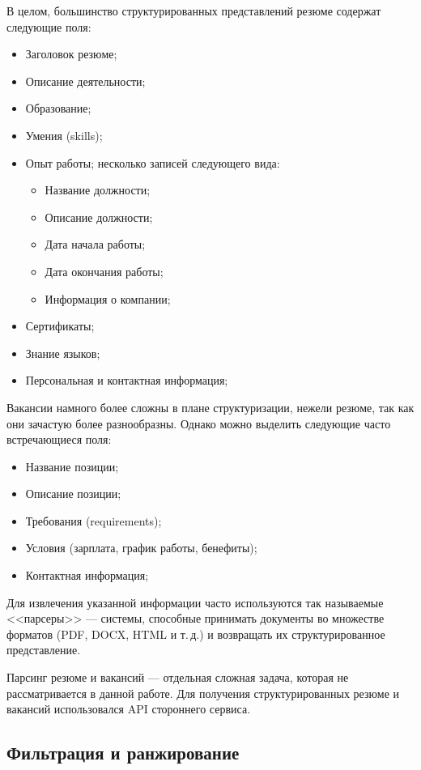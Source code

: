 \documentclass[14pt]{mmcs_article}
\begin{document}
В целом, большинство структурированных представлений резюме содержат следующие поля:

\begin{itemize}
  \item Заголовок резюме;
  \item Описание деятельности;
  \item Образование;
  \item Умения (skills);
  \item Опыт работы; несколько записей следующего вида:
        \begin{itemize}
          \item Название должности;
          \item Описание должности;
          \item Дата начала работы;
          \item Дата окончания работы;
          \item Информация о компании;
        \end{itemize}
  \item Сертификаты;
  \item Знание языков;
  \item Персональная и контактная информация;
\end{itemize}

Вакансии намного более сложны в плане структуризации, нежели резюме, так как они зачастую более разнообразны. Однако можно выделить следующие часто встречающиеся поля:

\begin{itemize}
  \item Название позиции;
  \item Описание позиции;
  \item Требования (requirements);
  \item Условия (зарплата, график работы, бенефиты);
  \item Контактная информация;
\end{itemize}

Для извлечения указанной информации часто используются так называемые <<парсеры>> --- системы, способные принимать документы во множестве форматов (PDF, DOCX, HTML и т.\,д.) и возвращать их структурированное представление.

Парсинг резюме и вакансий --- отдельная сложная задача, которая не рассматривается в данной работе. Для получения структурированных резюме и вакансий использовался API стороннего сервиса.

\subsection{Фильтрация и ранжирование}\label{filtering_and_ranking}
\end{document}
